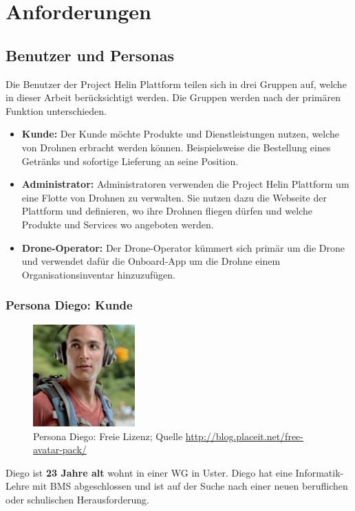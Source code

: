 \chapter{Anforderungen}
\section{Benutzer und Personas}
Die Benutzer der Project Helin Plattform teilen sich in drei Gruppen auf, welche in dieser Arbeit berücksichtigt werden. Die Gruppen werden nach der primären Funktion unterschieden.
\begin{itemize}
	\item{\textbf{Kunde:} Der Kunde möchte Produkte und Dienstleistungen nutzen, welche von Drohnen erbracht werden können. Beispielsweise die Bestellung eines Getränks und sofortige Lieferung an seine Position.}
	\item{\textbf{Administrator:} Administratoren verwenden die Project Helin Plattform um eine Flotte von Drohnen zu verwalten. Sie nutzen dazu die Webseite der Plattform und definieren, wo ihre Drohnen fliegen dürfen und welche Produkte und Services wo angeboten werden.}
	\item{\textbf{Drone-Operator:} Der Drone-Operator kümmert sich primär um die Drone und verwendet dafür die Onboard-App um die Drohne einem Organisationsinventar hinzuzufügen.}
\end{itemize}
\subsection{Persona Diego: Kunde}
\begin{figure}[h]
\centering
\includegraphics[width=0.35\textwidth]{images/persona-diego.jpg}
\caption{Persona Diego: Freie Lizenz; Quelle 
\protect\url{http://blog.placeit.net/free-avatar-pack/}}
\label{fig:diego}
\end{figure}
Diego ist \textbf{23 Jahre alt} wohnt in einer WG in Uster.
Diego hat eine Informatik-Lehre mit BMS abgeschlossen und ist auf der Suche nach einer neuen beruflichen oder schulischen Herausforderung.
